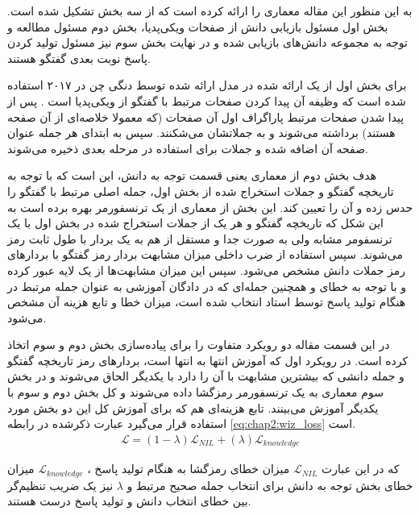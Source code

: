 به این منظور این مقاله معماری را ارائه کرده است که از سه بخش تشکیل شده است. بخش اول مسئول بازیابی دانش از صفحات ویکی‌پدیا، بخش دوم مسئول مطالعه و توجه به مجموعه دانش‌های بازیابی شده و در نهایت بخش سوم نیز مسئول تولید کردن پاسخ نوبت بعدی گفتگو هستند.

برای بخش اول از یک 
 ارائه شده در 
مدل ارائه شده توسط دنگی چن در ۲۰۱۷
استفاده شده است که وظیفه آن  پیدا کردن صفحات مرتبط با گفتگو از ویکی‌پدیا است
\cite{drqa_paper}
. پس از پیدا شدن صفحات مرتبط پاراگراف اول آن صفحات (که معمولا خلاصه‌ای از آن صفحه هستند) برداشته می‌شوند و به جملاتشان می‌‌شکنند. سپس به ابتدای هر جمله عنوان صفحه آن اضافه شده و جملات برای استفاده در مرحله بعدی ذخیره می‌شوند. 

هدف بخش دوم از معماری یعنی قسمت توجه به دانش، این است که با توجه به تاریخچه گفتگو و جملات استخراج شده از بخش اول، جمله اصلی مرتبط با گفتگو را حدس زده و آن را تعیین کند. این بخش از معماری از یک ترنسفورمر بهره برده است به این شکل که تاریخچه گفتگو و هر یک از جملات استخراج شده در بخش اول با یک ترنسفومر مشابه ولی به صورت جدا و مستقل از هم به یک بردار با طول ثابت رمز می‌شوند. سپس استفاده از ضرب داخلی میزان مشابهت بردار رمز  گفتگو با بردارهای رمز جملات دانش مشخص می‌شود. سپس این میزان مشابهت‌ها از یک لایه 
عبور کرده و با توجه به خطای 
و همچنین جمله‌ای که در دادگان آموزشی به عنوان جمله مرتبط در هنگام تولید پاسخ توسط استاد انتخاب شده است، میزان خطا و تابع هزینه آن مشخص می‌شود.

 در این قسمت مقاله دو رویکرد متفاوت را برای پیاده‌سازی بخش دوم و سوم اتخاذ کرده است. در رویکرد اول که آموزش انتها به انتها است، بردار‌های رمز  تاریخچه گفتگو و جمله دانشی که بیشترین مشابهت با آن را دارد با یکدیگر الحاق می‌شوند و در بخش سوم معماری به یک ترنسفورمر رمزگشا داده می‌شوند و کل بخش دوم و سوم با یکدیگر آموزش می‌بینند.
تابع هزینه‌ای هم که برای آموزش کل این دو بخش مورد استفاده قرار می‌گیرد عبارت ذکر‌شده در رابطه
\ref{eq:chap2:wiz_loss}
 است.
\\
\begin{equation}
\label{eq:chap2:wiz_loss}
\begin{split}
\mathcal{L} = (1- \lambda ) \mathcal{L}_{NIL} + (\lambda) \mathcal{L}_{knowledge}
\end{split}\end{equation}

که در این عبارت
$\mathcal{L}_{NIL}$
میزان خطای رمزگشا به هنگام تولید پاسخ
،
$\mathcal{L}_{knowledge}$
میزان خطای بخش توجه به دانش برای انتخاب جمله صحیح مرتبط
و
$\lambda$
نیز یک ضریب تنظیم‌گر بین خطای انتخاب دانش و تولید پاسخ درست هستند.

